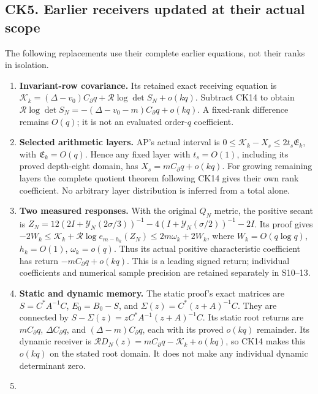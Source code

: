 \documentclass[10pt]{article}
\begin{document}
\subsection{CK5. Earlier receivers updated at their actual scope}\label{ck5.-earlier-receivers-updated-at-their-actual-scope}

The following replacements use their complete earlier equations, not their ranks in isolation.

\begin{enumerate}
\def\labelenumi{\arabic{enumi}.}
\tightlist
\item
  \textbf{Invariant-row covariance.} Its retained exact receiving equation is \(\mathcal K_k=(\Delta-v_0)C_\partial q+\mathcal R\log\det S_N+o(kq)\). Subtract CK14 to obtain \(\mathcal R\log\det S_N=-(\Delta-v_0-m)C_\partial q+o(kq)\). A fixed-rank difference remains \(O(q)\); it is not an evaluated order-\(q\) coefficient.
\item
  \textbf{Selected arithmetic layers.} AP's actual interval is \(0\le\mathcal K_k-X_s\le2t_s\mathfrak E_k\), with \(\mathfrak E_k=O(q)\). Hence any fixed layer with \(t_s=O(1)\), including its proved depth-eight domain, has \(X_s=mC_\partial q+o(kq)\). For growing remaining layers the complete quotient theorem following CK14 gives their own rank coefficient. No arbitrary layer distribution is inferred from a total alone.
\item
  \textbf{Two measured responses.} With the original \(Q_N\) metric, the positive secant is \(Z_N=12(2I+\mathscr Y_N(2\sigma/3))^{-1}-4(I+\mathscr Y_N(\sigma/2))^{-1}-2I\). Its proof gives \(-2W_k\le\mathcal K_k+\mathcal R\log e_{m-h_k}(Z_N)\le2m\omega_k+2W_k\), where \(W_k=O(q\log q)\), \(h_k=O(1)\), \(\omega_k=o(q)\). Thus its actual positive characteristic coefficient has return \(-mC_\partial q+o(kq)\). This is a leading signed return; individual coefficients and numerical sample precision are retained separately in S10--13.
\item
  \textbf{Static and dynamic memory.} The static proof's exact matrices are \(S=C^*A^{-1}C\), \(E_0=B_0-S\), and \(\Sigma(z)=C^*(z+A)^{-1}C\). They are connected by \(S-\Sigma(z)=zC^*A^{-1}(z+A)^{-1}C\). Its static root returns are \(mC_\partial q\), \(\Delta C_\partial q\), and \((\Delta-m)C_\partial q\), each with its proved \(o(kq)\) remainder. Its dynamic receiver is \(\mathcal RD_N(z)=mC_\partial q-\mathcal K_k+o(kq)\), so CK14 makes this \(o(kq)\) on the stated root domain. It does not make any individual dynamic determinant zero.
\item

\end{enumerate}
\end{document}
